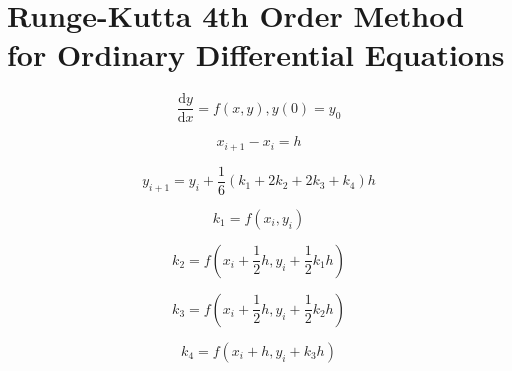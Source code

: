 \newcommand{\ud}{\mathrm{d}}

\section{Runge-Kutta 4th Order Method for Ordinary Differential Equations}

\[\frac{\ud y}{\ud x} = f(x, y), y(0) = y_0\]

\[x_{i + 1} - x_i = h\]

\[y_{i + 1} = y_i + \frac{1}{6}(k_1 + 2 k_2 + 2 k_3 + k_4) h\]

\[k_1 = f(x_i, y_i)\]

\[k_2 = f(x_i + \frac{1}{2} h, y_i + \frac{1}{2} k_1 h)\]

\[k_3 = f(x_i + \frac{1}{2} h, y_i + \frac{1}{2} k_2 h)\]

\[k_4 = f(x_i + h, y_i + k_3 h)\]
